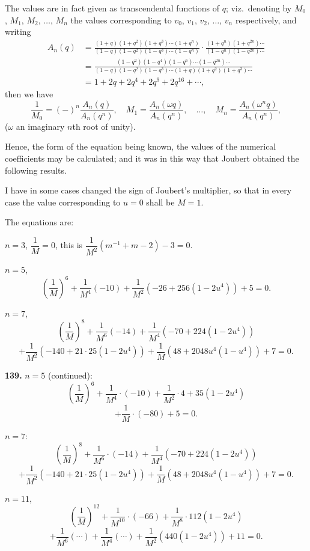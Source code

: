 \documentclass[11pt,a4paper]{book}
\begin{document}
The values are in fact given as transcendental functions of $q$; viz.\ denoting by $M_0$, $M_1$, $M_2$, $\ldots$, $M_n$ the values corresponding to $v_0$, $v_1$, $v_2$, $\ldots$, $v_n$ respectively, and writing
\begin{align*}
A_n(q) &= \frac{(1 + q)(1 + q^2)(1 + q^3)\cdots(1 + q^n)}{(1 - q)(1 - q^2)(1 - q^3)\cdots(1 - q^n)} \cdot \frac{(1 + q^n)(1 + q^{2n})\cdots}{(1 - q^n)(1 - q^{2n})\cdots} \\
&= \frac{(1 - q^2)(1 - q^4)(1 - q^6)\cdots(1 - q^{2n})\cdots}{(1 - q)(1 - q^2)(1 - q^3)\cdots(1 + q)(1 + q^2)(1 + q^3)\cdots} \\
&= 1 + 2q + 2q^4 + 2q^9 + 2q^{16} + \cdots,
\end{align*}
then we have
\[
\frac{1}{M_0} = (-)^n \frac{A_n(q)}{A_n(q^n)}, \quad
M_1 = \frac{A_n(\omega q)}{A_n(q^n)}, \quad \ldots, \quad
M_n = \frac{A_n(\omega^n q)}{A_n(q^n)},
\]
($\omega$ an imaginary $n$th root of unity).

Hence, the form of the equation being known, the values of the numerical coefficients may be calculated; and it was in this way that Joubert obtained the following results.

I have in some cases changed the sign of Joubert's multiplier, so that in every case the value corresponding to $u = 0$ shall be $M = 1$.

The equations are:

$n = 3$, $\dfrac{1}{M} = 0$, this is $\dfrac{1}{M^2}(m^{-1} + m - 2) - 3 = 0$.

\medskip
$n = 5$,
\[
\left(\frac{1}{M}\right)^6 + \frac{1}{M^4}(-10) + \frac{1}{M^2}(-26 + 256(1 - 2u^4)) + 5 = 0.
\]

\medskip
$n = 7$,
\[
\left(\frac{1}{M}\right)^8 + \frac{1}{M^6}(-14) + \frac{1}{M^4}(-70 + 224(1 - 2u^4))
\]
\[
+ \frac{1}{M^2}(-140 + 21 \cdot 25(1 - 2u^4)) + \frac{1}{M}(48 + 2048u^4(1 - u^4)) + 7 = 0.
\]


\noindent\textbf{139.} $n = 5$ (continued):
\[
\left(\frac{1}{M}\right)^6 + \frac{1}{M^4} \cdot (-10) + \frac{1}{M^2} \cdot 4 + 35(1 - 2u^4)
\]
\[
+ \frac{1}{M} \cdot (-80) + 5 = 0.
\]

$n = 7$:
\[
\left(\frac{1}{M}\right)^8 + \frac{1}{M^6} \cdot (-14) + \frac{1}{M^4}(-70 + 224(1 - 2u^4))
\]
\[
+ \frac{1}{M^2}(-140 + 21 \cdot 25(1 - 2u^4)) + \frac{1}{M}(48 + 2048u^4(1 - u^4)) + 7 = 0.
\]

$n = 11$,
\[
\left(\frac{1}{M}\right)^{12} + \frac{1}{M^{10}} \cdot (-66) + \frac{1}{M^8} \cdot 112(1 - 2u^4)
\]
\[
+ \frac{1}{M^6}(\cdots) + \frac{1}{M^4}(\cdots) + \frac{1}{M^2}(440(1 - 2u^4)) + 11 = 0.
\]
\end{document}
